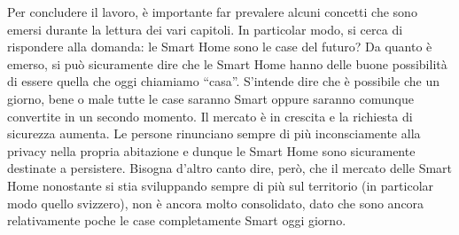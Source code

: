Per concludere il lavoro, è importante far prevalere alcuni concetti che sono emersi durante la lettura dei vari capitoli. In particolar modo, si cerca di rispondere alla domanda: le Smart Home sono le case del futuro? 
Da quanto è emerso, si può sicuramente dire che le Smart Home hanno delle buone possibilità di essere quella che oggi chiamiamo “casa”. S’intende dire che è possibile che un giorno, bene o male tutte le case saranno Smart oppure saranno comunque convertite in un secondo momento. Il mercato è in crescita e la richiesta di sicurezza aumenta. Le persone rinunciano sempre di più inconsciamente alla privacy nella propria abitazione e dunque le Smart Home sono sicuramente destinate a persistere. 
Bisogna d’altro canto dire, però, che il mercato delle Smart Home nonostante si stia sviluppando sempre di più sul territorio (in particolar modo quello svizzero), non è ancora molto consolidato, dato che sono ancora relativamente poche le case completamente Smart oggi giorno.
